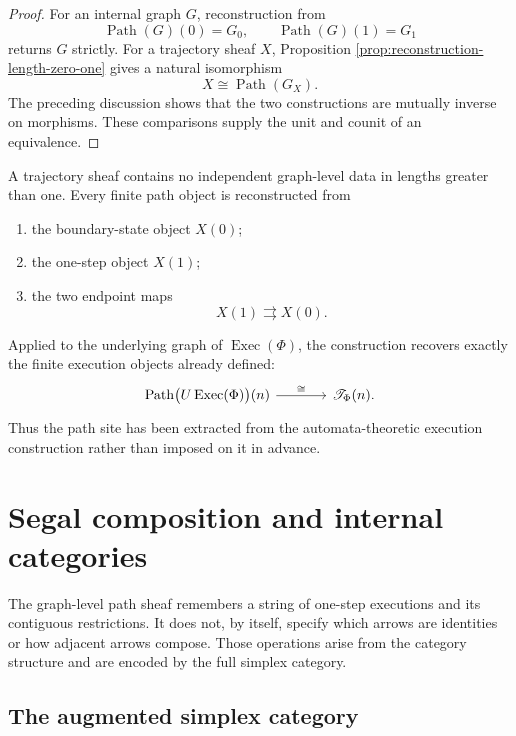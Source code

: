 \begin{proof}
For an internal graph \(G\), reconstruction from
\[
    \operatorname{Path}(G)(0)=G_0,
    \qquad
    \operatorname{Path}(G)(1)=G_1
\]
returns \(G\) strictly. For a trajectory sheaf \(X\), Proposition
\ref{prop:reconstruction-length-zero-one} gives a natural isomorphism
\[
    X\cong\operatorname{Path}(G_X).
\]
The preceding discussion shows that the two constructions are mutually
inverse on morphisms. These comparisons supply the unit and counit of an
equivalence.
\end{proof}

\begin{corollary}
\label{cor:temporal-data-of-graph}
A trajectory sheaf contains no independent graph-level data in lengths greater
than one. Every finite path object is reconstructed from
\begin{enumerate}
    \item the boundary-state object \(X(0)\);
    \item the one-step object \(X(1)\);
    \item the two endpoint maps
    \[
        X(1)\rightrightarrows X(0).
    \]
\end{enumerate}
\end{corollary}

Applied to the underlying graph of \(\operatorname{Exec}(\Phi)\), the
construction recovers exactly the finite execution objects already defined:
\[
\begin{tikzcd}[column sep=large]
    \operatorname{Path}
    \bigl(U\operatorname{Exec}(\Phi)\bigr)(n)
        \arrow[r, "\cong"]
    &
    \mathscr T_\Phi(n).
\end{tikzcd}
\]
Thus the path site has been extracted from the automata-theoretic execution
construction rather than imposed on it in advance.

\section{Segal composition and internal categories}
\label{sec:segal-enhancement-categorical-execution}

The graph-level path sheaf remembers a string of one-step executions and its
contiguous restrictions. It does not, by itself, specify which arrows are
identities or how adjacent arrows compose. Those operations arise from the
category structure and are encoded by the full simplex category.

\subsection{The augmented simplex category}
\label{subsec:augmented-simplex-category}

